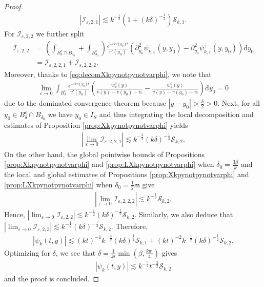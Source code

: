 \documentclass[11pt,reqno]{amsproc}
\theoremstyle{definition}
\numberwithin{equation}{section}
\newcommand{\cI}{{\mathcal I}}
\newcommand{\cS}{{\mathcal S}}
\renewcommand{\d}{\mathrm{d}}
\newcommand{\ep}{\varepsilon}
\begin{document}
\begin{proof}
\begin{align*}
\left| \cI_{\ep,2,1} \right| \lesssim k^{-\frac12}\left( 1 + (k\delta)^{-\frac12} \right) \cS_{k,1}.
\end{align*} 
For $\cI_{\ep,2,2}$ we further split
\begin{align*}
\cI_{\ep,2,2} &= \left( \int_{B_\delta^c\cap B_{\delta_0}}  + \int_{B_{\delta_0}^c} \right)  \frac{e^{-ikv(y_0)t }}{v'(y_0)}\left( \partial^2_{y_0}\psi_{k,\ep}^-(y,y_0) - \partial^2_{y_0}\psi_{k,\ep}^+(y,y_0) \right)  \d y_0 \\
&= \cI_{\ep,2,2,1} + \cI_{\ep,2,2,2}.
\end{align*}
Moreover, thanks to \eqref{eq:decomXkpynotpynotvarphi}, we note that
\begin{align*}
\lim_{\ep\rightarrow 0} \int_{B_\delta^c}  \frac{e^{-ikv(y_0)t }}{v'(y_0)}\left( \frac{w_k^0(y)}{v(y) - v(y_0) - i\ep} - \frac{w_k^0(y)}{v(y) - v(y_0) + i\ep} \right)  \d y_0 = 0
\end{align*}
due to the dominated convergence theorem because $|y-y_0|>\frac{\delta}{2}>0$. Next, for all $y_0\in B_\delta^c\cap B_{\delta_0}$ we have $y_0\in I_S$ and thus integrating the local decomposition and estimates of Proposition \ref{prop:Xkpynotpynotvarphi} yields
\begin{align*}
\left| \lim_{\ep\rightarrow 0} \cI_{\ep,2,2,1}  \right| \lesssim k^{-\frac32}(k\delta)^{-\frac12}\cS_{k,2}.
\end{align*} 
On the other hand, the global pointwise bounds of Propositions \ref{prop:Xkpynotpynotvarphi} and \ref{prop:LXkpynotpynotvarphi} when $\delta_0=\frac{3\beta}{k}$ and the local and global estimates of Propositions \ref{prop:Xkpynotpynotvarphi} and \ref{prop:LXkpynotpynotvarphi} when $\delta_0=\frac12\mathsf{m}$ give
\begin{align*}
\left| \lim_{\ep\rightarrow 0} \cI_{\ep,2,2,2}  \right| \lesssim k^{-\frac12}\cS_{k,2}.
\end{align*}
Hence, $ \left| \lim_{\ep\rightarrow 0} \cI_{\ep,2,2}  \right| \lesssim k^{-\frac12}(k\delta)^{-\frac12}\cS_{k,2}$.  Similarly, we also deduce that $\left| \lim_{\ep\rightarrow 0} \cI_{\ep,2,3}  \right| \lesssim k^{-\frac12}(k\delta)^{-\frac12}\cS_{k,2}$. Therefore,
\begin{align*}
\left| \psi_k(t,y) \right| \lesssim (kt)^{-1}k^{-\frac32}(k\delta)^{\frac12}\cS_{k,1} + (kt)^{-2}k^{-\frac12}(k\delta)^{-\frac12}\cS_{k,2}.
\end{align*}
Optimizing for $\delta$, we see that $\delta= \frac{1}{kt}\min \left( \beta, \frac{k\mathsf{m}}{4}\right) $ gives
\begin{align*}
\left| \psi_k(t,y) \right| \lesssim k^{-\frac52}t^{-\frac32}\cS_{k,2}
\end{align*}
and the proof is concluded.
\end{proof}
\end{document}
